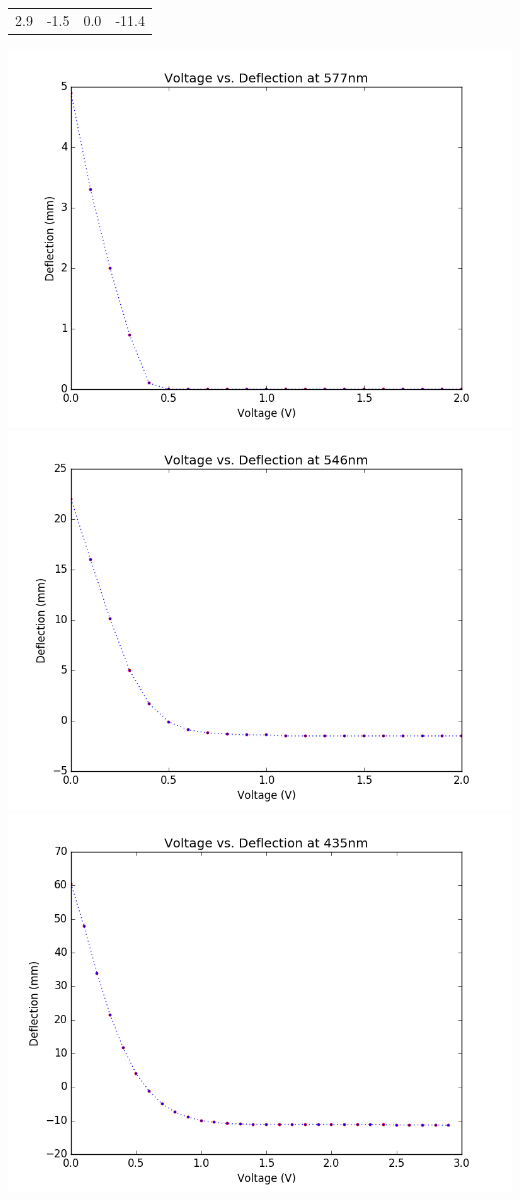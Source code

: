 \documentclass{amsart}
\begin{document}
\begin{table}[H]
\begin{minipage}{.45\textwidth}
\begin{tabular}{c|c|c|c}
2.9         & -1.5  & 0.0   & -11.4
\end{tabular}
\end{minipage}
%
\begin{minipage}{.5\textwidth}
    \centering
    \includegraphics[height=.23\textheight]{577.png}\\
    \includegraphics[height=.23\textheight]{546.png}\\
    \includegraphics[height=.23\textheight]{435.png}

\end{minipage}
\end{table}
\end{document}
